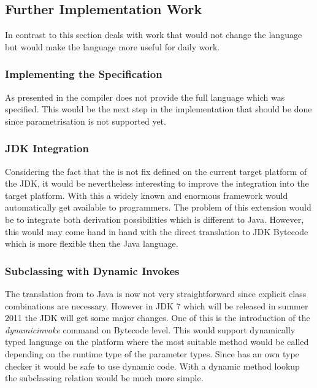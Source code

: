 
\subsection{Further Implementation Work}
In contrast to  this section deals with work that
would not change the language but would make the language more useful
for daily work.

\subsubsection{Implementing the Specification}
As presented in  the compiler does not provide the
full language which was specified. This would be the next step in the
implementation that should be done since parametrisation is not supported
yet.

\subsubsection{JDK Integration}
Considering the fact that the \ooplss is not fix defined on the current
target platform of the JDK, it would be nevertheless interesting to
improve the integration into the target platform. With this a widely
known and enormous framework would automatically get available to
\ooplss programmers. The problem of this extension would be to integrate
both derivation possibilities which is different to Java. However,
this would may come hand in hand with the direct translation to JDK
Bytecode which is more flexible then the Java language.

\subsubsection{Subclassing with Dynamic Invokes}
The translation from \ooplss to Java is now not very straightforward since
explicit class combinations are necessary. However in JDK 7 which will
be released in summer 2011 the JDK will get some major changes. One
of this is the introduction of the \emph{dynamicinvoke} command on
Bytecode level. This would support dynamically typed language on the
platform where the most suitable method would be called depending on the
runtime type of the parameter types. Since \ooplss has an own type
checker it would be safe to use dynamic code. With a dynamic method
lookup the subclassing relation would be much more simple.

